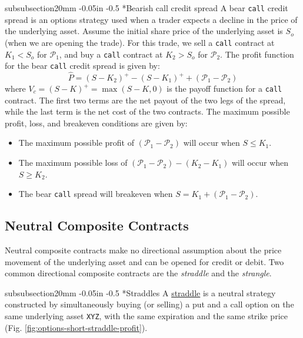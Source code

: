 \documentclass[11pt]{article}
\makeatletter
\theoremstyle{definition}
\renewcommand\subsubsection{\@startsection
	{subsubsection}{2}{0mm}
	{-0.05in}
	{-0.5\baselineskip}
	{\normalfont\normalsize\itshape\bfseries}}
\makeatother
\begin{document}
\subsubsection*{Bearish call credit spread}
A bear \texttt{call} credit spread is an options strategy used 
when a trader expects a decline in the price of the underlying asset. 
Assume the initial share price of the underlying asset is $S_{o}$ (when we are opening the trade).
For this trade, we sell a \texttt{call} contract at $K_{1}<S_{o}$ for $\mathcal{P}_{1}$, 
and buy a \texttt{call} contract at $K_{2}>S_{o}$ for $\mathcal{P}_{2}$. The profit function 
for the bear \texttt{call} credit spread is given by:
\begin{equation}
\hat{P} = (S-K_{2})^{+} - (S-K_{1})^{+} + (\mathcal{P}_{1}-\mathcal{P}_{2})
\end{equation}
where $V_{c} = (S-K)^{+}=\max(S-K,0)$ is the payoff function for a \texttt{call} contract. 
The first two terms are the net payout of the two legs of the spread, while the last term is the net cost of the two contracts. 
The maximum possible profit, loss, and breakeven conditions are given by:
\begin{itemize}
\item{The maximum possible profit of $\left(\mathcal{P}_{1} - \mathcal{P}_{2}\right)$ will occur when $S\leq{K_{1}}$.}
\item{The maximum possible loss of $\left(\mathcal{P}_{1} - \mathcal{P}_{2}\right) -(K_{2} - K_{1})$ will occur when $S\geq{K_{2}}$.}
\item{The bear \texttt{call} spread will breakeven when $S =  K_{1}+\left(\mathcal{P}_{1} - \mathcal{P}_{2}\right)$.}
\end{itemize}

\subsection{Neutral Composite Contracts}
Neutral composite contracts make no directional assumption about the price movement of the underlying asset and can be opened for credit or debit.
Two common directional composite contracts are the \textit{straddle} and the \textit{strangle}.	

\subsubsection*{Straddles}
A \href{https://www.investopedia.com/terms/s/straddle.asp}{straddle} is a neutral strategy constructed by simultaneously buying (or selling) 
a put and a call option on the same underlying asset \texttt{XYZ}, with the same expiration and the same strike price (Fig. \ref{fig:options-short-straddle-profit}). 
\end{document}
